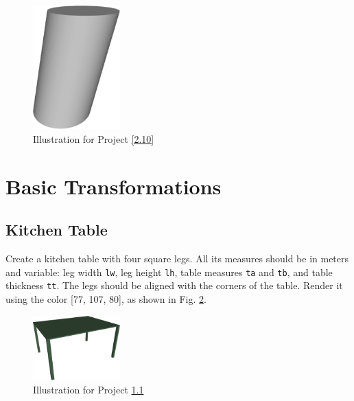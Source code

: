 \begin{figure}[!ht]
\begin{center}
\includegraphics[width=0.3\textwidth]{img/a10-shift.png}
\end{center}
\vspace{-2mm}
\caption{Illustration for Project \ref{2.10}}
\label{fig:a10}
\end{figure}




\section{Basic Transformations}



\subsection{Kitchen Table}\label{3.1}
Create a kitchen table with four square legs. All its measures should be in meters and 
variable: leg width {\tt lw}, leg height {\tt lh}, table measures {\tt ta} and {\tt tb}, and
table thickness {\tt tt}. The legs should be aligned with the corners of the table.
Render it using the color [77, 107, 80], as shown in Fig. \ref{fig:b1}.


\begin{figure}[!ht]
\begin{center}
\includegraphics[width=0.3\textwidth]{img/kitchentable.png}
\end{center}
\vspace{-2mm}
\caption{Illustration for Project \ref{3.1}}
\label{fig:b1}
\vspace{-1cm}
\end{figure}
\newpage



